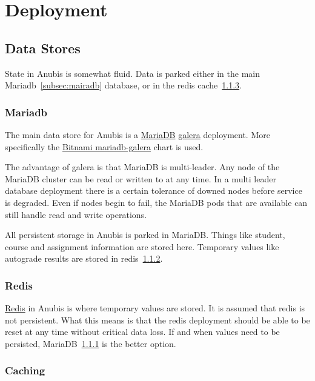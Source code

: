 \chapter{Deployment}\label{ch:deployment}

\section{Data Stores}\label{sec:data-stores}

State in Anubis is somewhat fluid.
Data is parked either in the main Mariadb~\ref{subsec:mairadb} database, or
in the redis cache~\ref{subsec:caching}.

\subsection{Mariadb}\label{subsec:mariadb}

The main data store for Anubis is a \href{https://mariadb.org/}{MariaDB}
\href{https://mariadb.com/kb/en/galera-cluster/}{galera} deployment.
More specifically the
\href{https://github.com/bitnami/charts/tree/master/bitnami/mariadb-galera}{Bitnami mariadb-galera} chart is used.

The advantage of galera is that MariaDB is multi-leader.
Any node of the MariaDB cluster can be read or written to at any time.
In a multi leader database deployment there is a certain tolerance of downed nodes before
service is degraded.
Even if nodes begin to fail, the MariaDB pods that are available can still handle
read and write operations.

All persistent storage in Anubis is parked in MariaDB.
Things like student, course and assignment information are stored here.
Temporary values like autograde results are stored in redis~\ref{subsec:redis}.

\subsection{Redis}\label{subsec:redis}

\href{https://redis.io/}{Redis} in Anubis is where temporary values are stored.
It is assumed that redis is not persistent.
What this means is that the redis deployment should be able to be reset
at any time without critical data loss.
If and when values need to be persisted, MariaDB~\ref{subsec:mariadb} is the better option.

\subsection{Caching}\label{subsec:caching}

